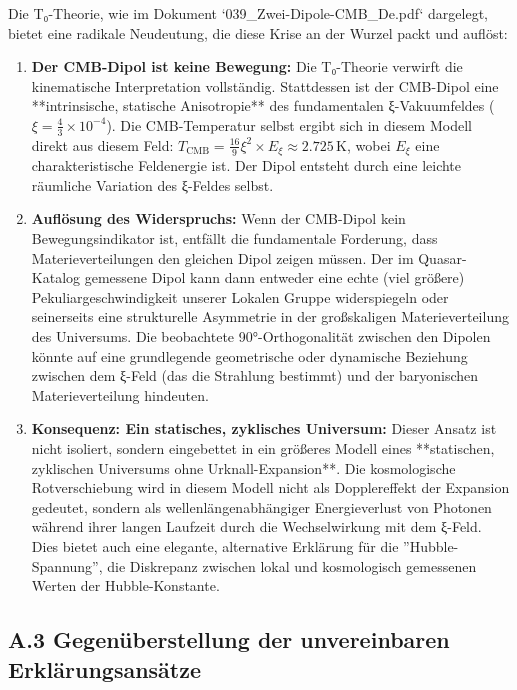 	Die T₀-Theorie, wie im Dokument `039\_Zwei-Dipole-CMB\_De.pdf` dargelegt, bietet eine radikale Neudeutung, die diese Krise an der Wurzel packt und auflöst:
	
	\begin{enumerate}
		\item \textbf{Der CMB-Dipol ist keine Bewegung:} Die T₀-Theorie verwirft die kinematische Interpretation vollständig. Stattdessen ist der CMB-Dipol eine **intrinsische, statische Anisotropie** des fundamentalen ξ-Vakuumfeldes ($ \xi = \frac{4}{3} \times 10^{-4} $). Die CMB-Temperatur selbst ergibt sich in diesem Modell direkt aus diesem Feld: $ T_{\text{CMB}} = \frac{16}{9} \xi^2 \times E_\xi \approx 2.725 \, \text{K} $, wobei $E_\xi$ eine charakteristische Feldenergie ist. Der Dipol entsteht durch eine leichte räumliche Variation des ξ-Feldes selbst.
		
		\item \textbf{Auflösung des Widerspruchs:} Wenn der CMB-Dipol kein Bewegungsindikator ist, entfällt die fundamentale Forderung, dass Materieverteilungen den gleichen Dipol zeigen müssen. Der im Quasar-Katalog gemessene Dipol kann dann entweder eine echte (viel größere) Pekuliargeschwindigkeit unserer Lokalen Gruppe widerspiegeln oder seinerseits eine strukturelle Asymmetrie in der großskaligen Materieverteilung des Universums. Die beobachtete 90°-Orthogonalität zwischen den Dipolen könnte auf eine grundlegende geometrische oder dynamische Beziehung zwischen dem ξ-Feld (das die Strahlung bestimmt) und der baryonischen Materieverteilung hindeuten.
		
		\item \textbf{Konsequenz: Ein statisches, zyklisches Universum:} Dieser Ansatz ist nicht isoliert, sondern eingebettet in ein größeres Modell eines **statischen, zyklischen Universums ohne Urknall-Expansion**. Die kosmologische Rotverschiebung wird in diesem Modell nicht als Dopplereffekt der Expansion gedeutet, sondern als wellenlängenabhängiger Energieverlust von Photonen während ihrer langen Laufzeit durch die Wechselwirkung mit dem ξ-Feld. Dies bietet auch eine elegante, alternative Erklärung für die ''Hubble-Spannung'', die Diskrepanz zwischen lokal und kosmologisch gemessenen Werten der Hubble-Konstante.
	\end{enumerate}
	
	\subsection*{A.3 Gegenüberstellung der unvereinbaren Erklärungsansätze}
	

